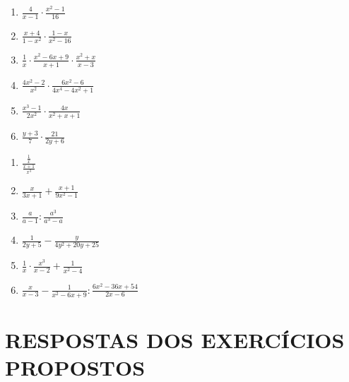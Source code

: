 \begin{exercicios}
    \begin{multicols}{3}{\large
        \begin{enumerate} [label=\alph*)]
            \item $\frac{4}{x-1} \cdot \frac{x^2-1}{16}$
            
            \item $\frac{x+4}{1-x^2} \cdot \frac{1-x}{x^2-16}$
            
            \item $\frac{1}{x} \cdot \frac{x^2-6x+9}{x+1} \cdot \frac{x^2+x}{x-3}$
            
            \item $\frac{4x^2-2}{x^2} \cdot \frac{6x^2-6}{4x^4-4x^2+1}$
            
            \item $\frac{x^3-1}{2x^2} \cdot \frac{4x}{x^2+x+1}$
            
            \item $\frac{y+3}{7} \cdot \frac{21}{2y+6}$
        \end{enumerate}
    }\end{multicols}
    
    
    \begin{multicols}{2}{\large
        \begin{enumerate} [label=\alph*)]
            \item {\Large $\frac{\frac{1}{x}}{\frac{x+1}{x^3}}$}
            
            \item $\frac{x}{3x+1} + \frac{x+1}{9x^2-1}$
            
            \item $\frac{a}{a-1} : \frac{a^3}{a^3-a}$
            
            \item $\frac{1}{2y+5} - \frac{y}{4y^2+20y+25}$
            
            \item $\frac{1}{x} \cdot \frac{x^3}{x-2} + \frac{1}{x^2-4}$
            
            \item $\frac{x}{x-3} - \frac{1}{x^2-6x+9} : \frac{6x^2-36x+54}{2x-6}$
        \end{enumerate}
    }\end{multicols}

\end{exercicios}
\section{RESPOSTAS DOS EXERCÍCIOS PROPOSTOS}

